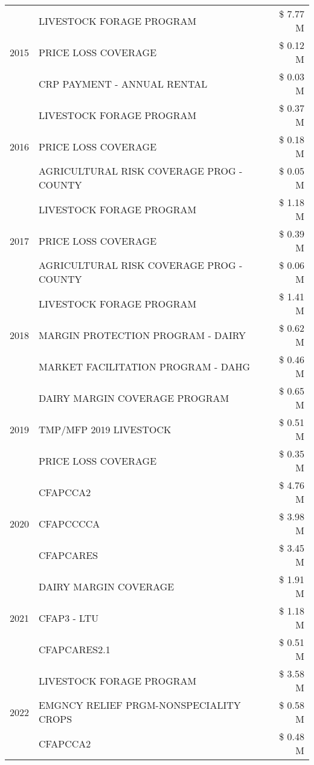 \begin{tabular}{llr}
\cline{1-3}
\multirow[t]{3}{*}{2015} & LIVESTOCK FORAGE PROGRAM & \$ 7.77 M \\
 & PRICE LOSS COVERAGE & \$ 0.12 M \\
 & CRP PAYMENT - ANNUAL RENTAL & \$ 0.03 M \\
\cline{1-3}
\multirow[t]{3}{*}{2016} & LIVESTOCK FORAGE PROGRAM & \$ 0.37 M \\
 & PRICE LOSS COVERAGE & \$ 0.18 M \\
 & AGRICULTURAL RISK COVERAGE PROG - COUNTY & \$ 0.05 M \\
\cline{1-3}
\multirow[t]{3}{*}{2017} & LIVESTOCK FORAGE PROGRAM & \$ 1.18 M \\
 & PRICE LOSS COVERAGE & \$ 0.39 M \\
 & AGRICULTURAL RISK COVERAGE PROG - COUNTY & \$ 0.06 M \\
\cline{1-3}
\multirow[t]{3}{*}{2018} & LIVESTOCK FORAGE PROGRAM & \$ 1.41 M \\
 & MARGIN PROTECTION PROGRAM - DAIRY & \$ 0.62 M \\
 & MARKET FACILITATION PROGRAM - DAHG & \$ 0.46 M \\
\cline{1-3}
\multirow[t]{3}{*}{2019} & DAIRY MARGIN COVERAGE PROGRAM & \$ 0.65 M \\
 & TMP/MFP 2019 LIVESTOCK & \$ 0.51 M \\
 & PRICE LOSS COVERAGE & \$ 0.35 M \\
\cline{1-3}
\multirow[t]{3}{*}{2020} & CFAPCCA2 & \$ 4.76 M \\
 & CFAPCCCCA & \$ 3.98 M \\
 & CFAPCARES & \$ 3.45 M \\
\cline{1-3}
\multirow[t]{3}{*}{2021} & DAIRY MARGIN COVERAGE & \$ 1.91 M \\
 & CFAP3 - LTU & \$ 1.18 M \\
 & CFAPCARES2.1 & \$ 0.51 M \\
\cline{1-3}
\multirow[t]{3}{*}{2022} & LIVESTOCK FORAGE PROGRAM & \$ 3.58 M \\
 & EMGNCY RELIEF PRGM-NONSPECIALITY CROPS & \$ 0.58 M \\
 & CFAPCCA2 & \$ 0.48 M \\
\cline{1-3}
\bottomrule
\end{tabular}
